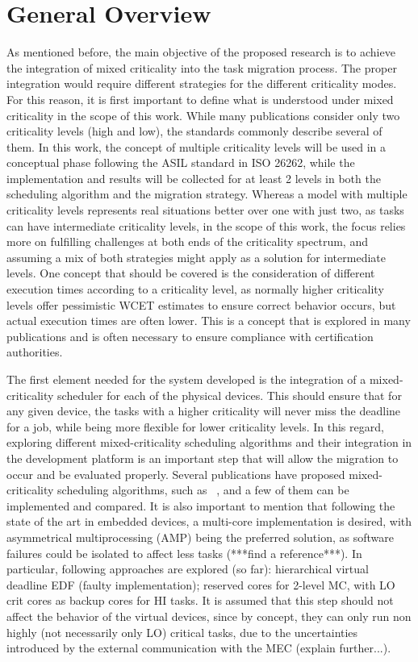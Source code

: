 \section{General Overview}\label{section:descriptionapproach}

As mentioned before, the main objective of the proposed research is to achieve the integration of mixed criticality into the task migration process. The proper integration would require different strategies for the different criticality modes. For this reason, it is first important to define what is understood under mixed criticality in the scope of this work. While many publications consider only two criticality levels (high and low), the standards commonly describe several of them. In this work, the concept of multiple criticality levels will be used in a conceptual phase following the ASIL standard in ISO 26262, while the implementation and results will be collected for at least 2 levels in both the scheduling algorithm and the migration strategy. Whereas a model with multiple criticality levels represents real situations better over one with just two, as tasks can have intermediate criticality levels, in the scope of this work, the focus relies more on fulfilling challenges at both ends of the criticality spectrum, and assuming a mix of both strategies might apply as a solution for intermediate levels. One concept that should be covered is the consideration of different execution times according to a criticality level, as normally higher criticality levels offer pessimistic WCET estimates to ensure correct behavior occurs, but actual execution times are often lower. This is a concept that is explored in many publications and is often necessary to ensure compliance with certification authorities.

The first element needed for the system developed is the integration of a mixed-criticality scheduler for each of the physical devices. This should ensure that for any given device, the tasks with a higher criticality will never miss the deadline for a job, while being more flexible for lower criticality levels. In this regard, exploring different mixed-criticality scheduling algorithms and their integration in the development platform is an important step that will allow the migration to occur and be evaluated properly. Several publications have proposed mixed-criticality scheduling algorithms, such as ~\parencite{baruah1, fleming1, zhao1, baruah2, lili1}, and a few of them can be implemented and compared. It is also important to mention that following the state of the art in embedded devices, a multi-core implementation is desired, with asymmetrical multiprocessing (AMP) being the preferred solution, as software failures could be isolated to affect less tasks (***find a reference***). In particular, following approaches are explored (so far): hierarchical virtual deadline EDF (faulty implementation); reserved cores for 2-level MC, with LO crit cores as backup cores for HI tasks. It is assumed that this step should not affect the behavior of the virtual devices, since by concept, they can only run non highly (not necessarily only LO) critical tasks, due to the uncertainties introduced by the external communication with the MEC (explain further...).

